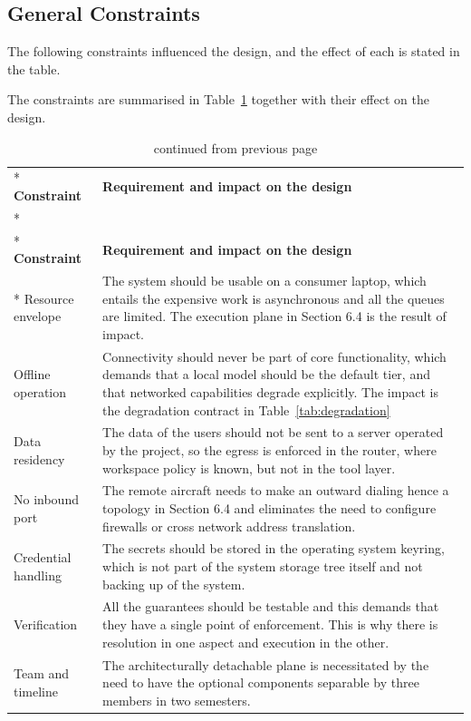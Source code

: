 \documentclass{FastFyp}
\begin{document}
\subsection{General Constraints}
The following constraints influenced the design, and the effect of each is stated in the table.

The constraints are summarised in Table~\ref{tab:constraints} together with their effect on the design.

{\small
{}
\begin{longtable}{|p{2.9cm}|p{11.0cm}|}
\caption{Design constraints.}\label{tab:constraints}\\*
\hline
\textbf{Constraint} & \textbf{Requirement and impact on the design} \\*
\hline
\endfirsthead
\caption[]{continued from previous page}\\*
\hline
\textbf{Constraint} & \textbf{Requirement and impact on the design} \\*
\hline
\endhead
Resource envelope & The system should be usable on a consumer laptop, which entails the expensive work is asynchronous and all the queues are limited. The execution plane in Section 6.4 is the result of impact. \\
\hline
Offline operation & Connectivity should never be part of core functionality, which demands that a local model should be the default tier, and that networked capabilities degrade explicitly. The impact is the degradation contract in Table~\ref{tab:degradation} \\
\hline
Data residency & The data of the users should not be sent to a server operated by the project, so the egress is enforced in the router, where workspace policy is known, but not in the tool layer. \\
\hline
No inbound port & The remote aircraft needs to make an outward dialing hence a topology in Section 6.4 and eliminates the need to configure firewalls or cross network address translation. \\
\hline
Credential handling & The secrets should be stored in the operating system keyring, which is not part of the system storage tree itself and not backing up of the system. \\
\hline
Verification & All the guarantees should be testable and this demands that they have a single point of enforcement. This is why there is resolution in one aspect and execution in the other. \\
\hline
Team and timeline & The architecturally detachable plane is necessitated by the need to have the optional components separable by three members in two semesters. \\
\hline
\end{longtable}
}
\end{document}
